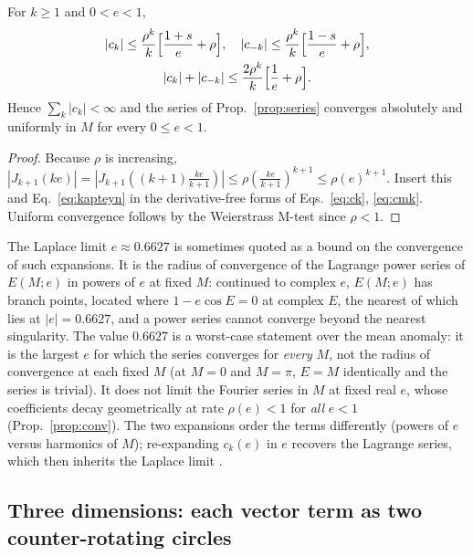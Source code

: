 \begin{proposition}
\label{prop:conv}
For $k\ge1$ and $0<e<1$,
\begin{gather}
|c_k|\le\frac{\rho^k}{k}\Big[\frac{1+s}{e}+\rho\Big],\quad
|c_{-k}|\le\frac{\rho^k}{k}\Big[\frac{1-s}{e}+\rho\Big],\notag\\
|c_k|+|c_{-k}|\le\frac{2\rho^k}{k}\Big[\frac1e+\rho\Big].
\label{eq:ckbound}
\end{gather}
Hence $\sum_k|c_k|<\infty$ and the series of Prop.~\ref{prop:series}
converges absolutely and uniformly in $M$ for every $0\le e<1$.
\end{proposition}
\begin{proof}
Because $\rho$ is increasing, $|J_{k+1}(ke)|=|J_{k+1}((k+1)\tfrac{ke}{k+1})|
\le\rho(\tfrac{ke}{k+1})^{k+1}\le\rho(e)^{k+1}$. Insert this and
Eq.~\eqref{eq:kapteyn} in the derivative-free forms of Eqs.~\eqref{eq:ck},
\eqref{eq:cmk}. Uniform convergence follows by the Weierstrass M-test since
$\rho<1$.
\end{proof}

The Laplace limit $e\approx0.6627$ is sometimes quoted as a bound on
the convergence of such expansions. It is the radius of convergence of the
Lagrange power series of $E(M;e)$ in powers of $e$ at fixed $M$: continued
to complex $e$, $E(M;e)$ has branch points, located where
$1-e\cos E=0$ at complex $E$, the nearest of which lies at $|e|=0.6627$, and
a power series cannot converge beyond the nearest singularity. The value
$0.6627$ is a worst-case statement over the mean anomaly: it is the largest $e$
for which the series converges for \emph{every} $M$, not the radius of
convergence at each fixed $M$ (at $M=0$ and $M=\pi$, $E=M$ identically and the
series is trivial). It does not
limit the Fourier series in $M$ at fixed real $e$, whose coefficients decay
geometrically at rate $\rho(e)<1$ for \emph{all} $e<1$
(Prop.~\ref{prop:conv}). The two expansions order the terms differently
(powers of $e$ versus harmonics of $M$); re-expanding $c_k(e)$ in $e$ recovers
the Lagrange series, which then inherits the Laplace limit
\cite{Dutka1997,Colwell1993}.

\subsection{Three dimensions: each vector term as two counter-rotating circles}
\label{sec:th-3d}

